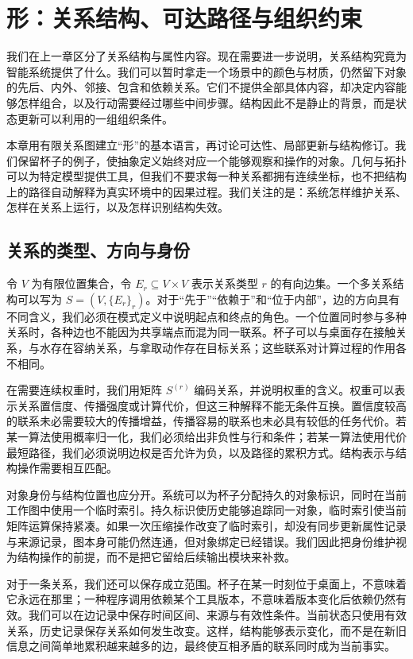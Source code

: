 \chapter{形：关系结构、可达路径与组织约束}
\label{chp:morphos_skeleton}

我们在上一章区分了关系结构与属性内容。现在需要进一步说明，关系结构究竟为智能系统提供了什么。我们可以暂时拿走一个场景中的颜色与材质，仍然留下对象的先后、内外、邻接、包含和依赖关系。它们不提供全部具体内容，却决定内容能够怎样组合，以及行动需要经过哪些中间步骤。结构因此不是静止的背景，而是状态更新可以利用的一组组织条件。

本章用有限关系图建立“形”的基本语言，再讨论可达性、局部更新与结构修订。我们保留杯子的例子，使抽象定义始终对应一个能够观察和操作的对象。几何与拓扑可以为特定模型提供工具，但我们不要求每一种关系都拥有连续坐标，也不把结构上的路径自动解释为真实环境中的因果过程。我们关注的是：系统怎样维护关系、怎样在关系上运行，以及怎样识别结构失效。

\section{关系的类型、方向与身份}
\label{sec:morphos_definition}

令 $V$ 为有限位置集合，令 $E_r\subseteq V\times V$ 表示关系类型 $r$ 的有向边集。一个多关系结构可以写为 $S=(V,\{E_r\}_r)$。对于“先于”“依赖于”和“位于内部”，边的方向具有不同含义，我们必须在模式定义中说明起点和终点的角色。一个位置同时参与多种关系时，各种边也不能因为共享端点而混为同一联系。杯子可以与桌面存在接触关系，与水存在容纳关系，与拿取动作存在目标关系；这些联系对计算过程的作用各不相同。

在需要连续权重时，我们用矩阵 $S^{(r)}$ 编码关系，并说明权重的含义。权重可以表示关系置信度、传播强度或计算代价，但这三种解释不能无条件互换。置信度较高的联系未必需要较大的传播增益，传播容易的联系也未必具有较低的任务代价。若某一算法使用概率归一化，我们必须给出非负性与行和条件；若某一算法使用代价最短路径，我们必须说明边权是否允许为负，以及路径的累积方式。结构表示与结构操作需要相互匹配。

对象身份与结构位置也应分开。系统可以为杯子分配持久的对象标识，同时在当前工作图中使用一个临时索引。持久标识使历史能够追踪同一对象，临时索引使当前矩阵运算保持紧凑。如果一次压缩操作改变了临时索引，却没有同步更新属性记录与来源记录，图本身可能仍然连通，但对象绑定已经错误。我们因此把身份维护视为结构操作的前提，而不是把它留给后续输出模块来补救。

对于一条关系，我们还可以保存成立范围。杯子在某一时刻位于桌面上，不意味着它永远在那里；一种程序调用依赖某个工具版本，不意味着版本变化后依赖仍然有效。我们可以在边记录中保存时间区间、来源与有效性条件。当前状态只使用有效关系，历史记录保存关系如何发生改变。这样，结构能够表示变化，而不是在新旧信息之间简单地累积越来越多的边，最终使互相矛盾的联系同时成为当前事实。

